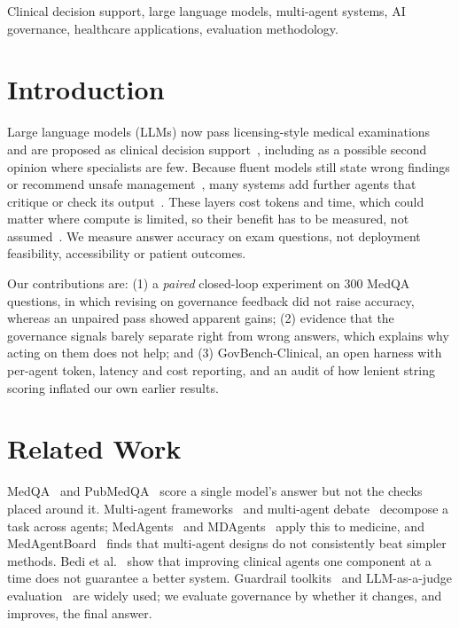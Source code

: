 \documentclass[conference]{IEEEtran}
\begin{document}
\begin{IEEEkeywords}
Clinical decision support, large language models, multi-agent systems, AI governance, healthcare applications,
evaluation methodology.
\end{IEEEkeywords}

\section{Introduction}
Large language models (LLMs) now pass licensing-style medical examinations~\cite{singhal2023large,nori2023capabilities} and
are proposed as clinical decision support~\cite{rajpurkar2022ai}, including as a possible second opinion where
specialists are few. Because fluent models still state wrong findings or recommend unsafe
management~\cite{hager2024evaluation,pal2023medhalt}, many systems add further agents that critique or check its
output~\cite{hong2023metagpt,wu2023autogen,du2023improving}. These layers cost tokens and time, which could matter
where compute is limited, so their benefit has to be measured, not assumed~\cite{bedi2025optimization}. We measure
answer accuracy on exam questions, not deployment feasibility, accessibility or patient outcomes.

Our contributions are: (1) a \emph{paired} closed-loop experiment on 300 MedQA questions, in which revising on
governance feedback did not raise accuracy, whereas an unpaired pass showed apparent gains; (2) evidence that the
governance signals barely separate right from wrong answers, which explains why acting on them does not help; and
(3) GovBench-Clinical, an open harness with per-agent token, latency and cost reporting, and an audit of how lenient
string scoring inflated our own earlier results.

\section{Related Work}
MedQA~\cite{jin2021medqa} and PubMedQA~\cite{jin2019pubmedqa} score a single model's answer but not the checks placed
around it. Multi-agent frameworks~\cite{hong2023metagpt,wu2023autogen,chen2023agentverse} and multi-agent
debate~\cite{du2023improving} decompose a task across agents; MedAgents~\cite{tang2024medagents} and
MDAgents~\cite{kim2024mdagents} apply this to medicine, and MedAgentBoard~\cite{zhu2025medagentboard} finds that
multi-agent designs do not consistently beat simpler methods. Bedi et al.~\cite{bedi2025optimization} show that
improving clinical agents one component at a time does not guarantee a better system. Guardrail
toolkits~\cite{rebedea2023nemo} and LLM-as-a-judge evaluation~\cite{zheng2023judging} are widely used; we evaluate
governance by whether it changes, and improves, the final answer.
\end{document}
